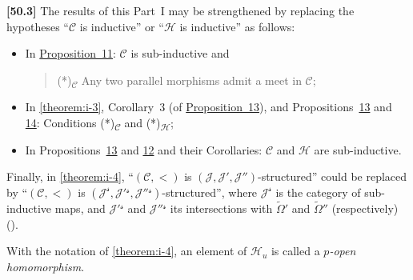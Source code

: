 \documentclass[a4paper,fleqn]{article}
\theoremstyle{plain}
\theoremstyle{definition}
\newenvironment{definition}[1]
  {\renewcommand\theinnerdefinition{#1}\innerdefinition}
  {\endinnerdefinition}
\newenvironment{longcomm}[1]
  {\noindent\textbf{[#1]}\rmfamily}
  {}
\newcommand{\CC}{\mathcal{C}}
\newcommand{\HH}{\mathcal{H}}
\newcommand{\JJ}{\mathcal{J}}
\begin{document}
\begin{longcomm}{50.3}
  The results of this Part~I may be strengthened by replacing the hypotheses ``$\CC$ is inductive'' or ``$\HH$ is inductive'' as follows:
  \begin{itemize}
    \item In \hyperref[proposition:i-11]{Proposition~11}:
      $\CC$ is sub-inductive and
      \begin{quote}
        (*)\textsubscript{$\CC$}
        Any two parallel morphisms admit a meet in $\CC$;
      \end{quote}

    \item In \cref{theorem:i-3}, Corollary~3 (of \hyperref[proposition:i-13]{Proposition~13}), and Propositions~\hyperref[proposition:i-13]{13} and \hyperref[proposition:i-14]{14}:
      Conditions (*)\textsubscript{$\CC$} and (*)\textsubscript{$\HH$};

    \item In Propositions~\hyperref[proposition:i-13]{13} and \hyperref[proposition:i-12]{12} and their Corollaries:
      $\CC$ and $\HH$ are sub-inductive.
  \end{itemize}

  Finally, in \cref{theorem:i-4}, ``$(\CC,<)$ is $(\JJ,\JJ',\JJ'')$-structured'' could be replaced by ``$(\CC,<)$ is $(\JJ^\mathcal{s},\JJ'{}^\mathcal{s},\JJ''{}^\mathcal{s})$-structured'', where $\JJ^\mathcal{s}$ is the category of sub-inductive maps, and $\JJ'{}^\mathcal{s}$ and $\JJ''{}^\mathcal{s}$ its intersections with $\widetilde{\Omega}'$ and $\widetilde{\Omega}''$ (respectively) (\cite{coll69}).
\end{longcomm}

\begin{definition}{10}
\label{definition:i-10}
  With the notation of \cref{theorem:i-4}, an element of $\HH_u$ is called a \emph{$p$-open homomorphism}.
\end{definition}
\end{document}
